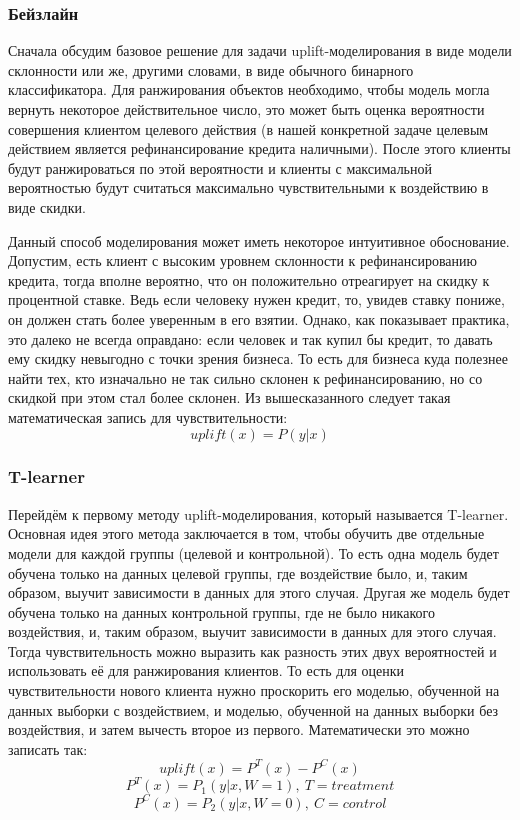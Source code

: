 \subsubsection*{Бейзлайн}

Сначала обсудим базовое решение для задачи uplift-моделирования в виде модели склонности или же, другими словами, в виде обычного бинарного классификатора. Для ранжирования объектов необходимо, чтобы модель могла вернуть некоторое действительное число, это может быть оценка вероятности совершения клиентом целевого действия (в нашей конкретной задаче целевым действием является рефинансирование кредита наличными). После этого клиенты будут ранжироваться по этой вероятности и клиенты с максимальной вероятностью будут считаться максимально чувствительными к воздействию в виде скидки.

Данный способ моделирования может иметь некоторое интуитивное обоснование. Допустим, есть клиент с высоким уровнем склонности к рефинансированию кредита, тогда вполне вероятно, что он положительно отреагирует на скидку к процентной ставке. Ведь если человеку нужен кредит, то, увидев ставку пониже, он должен стать более уверенным в его взятии. Однако, как показывает практика, это далеко не всегда оправдано: если человек и так купил бы кредит, то давать ему скидку невыгодно с точки зрения бизнеса. То есть для бизнеса куда полезнее найти тех, кто изначально не так сильно склонен к рефинансированию, но со скидкой при этом стал более склонен. Из вышесказанного следует такая математическая запись для чувствительности:
$$
    uplift(x) = P(y | x)
$$

\subsubsection*{T-learner}

Перейдём к первому методу uplift-моделирования, который называется T-learner. Основная идея этого метода заключается в том, чтобы обучить две отдельные модели для каждой группы (целевой и контрольной). То есть одна модель будет обучена только на данных целевой группы, где воздействие было, и, таким образом, выучит зависимости в данных для этого случая. Другая же модель будет обучена только на данных контрольной группы, где не было никакого воздействия, и, таким образом, выучит зависимости в данных для этого случая. Тогда чувствительность можно выразить как разность этих двух вероятностей и использовать её для ранжирования клиентов. То есть для оценки чувствительности нового клиента нужно проскорить его моделью, обученной на данных выборки с воздействием, и моделью, обученной на данных выборки без воздействия, и затем вычесть второе из первого. Математически это можно записать так:
$$
    uplift(x) = P^T(x) - P^C(x)
$$
$$
    P^T(x) = P_1(y | x, W = 1), \: T = treatment
$$
$$
    P^C(x) = P_2(y | x, W = 0), \: C = control
$$

